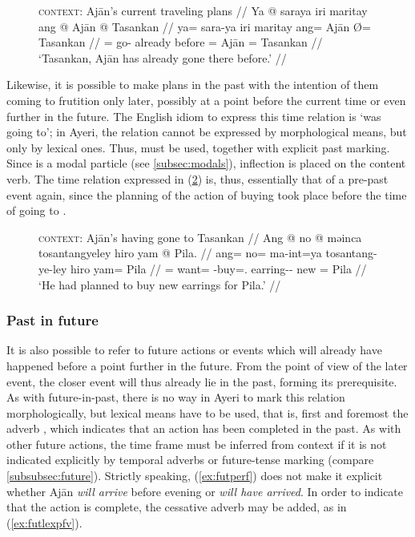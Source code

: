 \begin{figure}[h]
\ex\label{ex:nopstmkr}
\begingl
	\glpreamble \textsc{context:} Ajān's current traveling plans //
	\gla Ya @ saraya iri maritay ang @ Ajān {} @ Tasankan //
	\glb ya= sara-ya iri maritay ang= Ajān Ø= Tasankan //
	\glc \LocT{}= go-\TsgM{} already before \Aarg{}= Ajān \Top{}= %
		Tasankan //
	\glft `Tasankan, Ajān has already gone there before.' //
\endgl
\xe
\end{figure}

Likewise, it is possible to make plans in the past with the intention of them
coming to frutition only later, possibly at a point before the current time or
even further in the future. The English idiom to express this time relation is
`was going to'; in Ayeri, the relation cannot be expressed by morphological
means, but only by lexical ones. Thus,  must be
used, together with explicit past marking. Since  is a modal
particle (see \autoref{subsec:modals}), inflection is placed on the content
verb. The time relation expressed in (\ref{ex:pstplan}) is, thus, essentially
that of a pre-past event again, since the planning of the action of buying took
place before the time of going to .

\begin{figure}[h]
\ex\label{ex:pstplan}
\begingl
	\glpreamble \textsc{context}: Ajān's having gone to Tasankan //
	\gla Ang @ no @ məinca tosantangyeley hiro yam @ Pila. //
	\glb ang= no= ma-int=ya tosantang-ye-ley hiro yam= Pila //
	\glc \AgtT{}= want= \Pst{}-buy=\TsgM{}.\Top{} earring-\Pl{}-\PargI{} new 
		\Dat{}= Pila //
	\glft `He had planned to buy new earrings for Pila.' //
\endgl
\xe
\end{figure}


\subsubsection{Past in future}

It is also possible to refer to future actions or events which will already
have happened before a point further in the future. From the point of view of
the later event, the closer event will thus already lie in the past, forming
its prerequisite. As with future-in-past, there is no way in Ayeri to mark this
relation morphologically, but lexical means have to be used, that is, first and
foremost the adverb , which indicates that an action
has been completed in the past. As with other future actions, the time frame
must be inferred from context if it is not indicated explicitly by temporal
adverbs or future-tense marking (compare \autoref{subsubsec:future}). Strictly
speaking, (\ref{ex:futperf}) does not make it explicit whether Ajān \emph{will
arrive} before evening or \emph{will have arrived}. In order to indicate that
the action is complete, the cessative adverb
 may be added, as in (\ref{ex:futlexpfv}).

